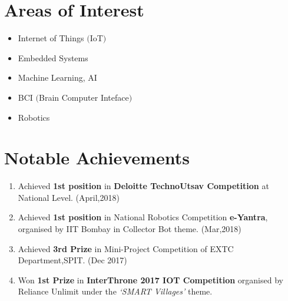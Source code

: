 \documentclass[margin]{res}
\begin{document}
\begin{resume}
\section{Areas of Interest}
\begin{itemize}
\item Internet of Things $($IoT$)$
\item Embedded Systems
\item Machine Learning, AI
\item BCI $($Brain Computer Inteface$)$
\item Robotics
\end{itemize}

\section{Notable Achievements}
\begin{enumerate}
\item Achieved \textbf{1st position} in \textbf{Deloitte TechnoUtsav Competition} at National Level. \hfill   (April,2018)
\item Achieved \textbf{1st position} in National Robotics Competition \textbf{e-Yantra}, organised by IIT Bombay in Collector Bot theme. \hfill   (Mar,2018)
\item Achieved \textbf{3rd Prize} in Mini-Project Competition of EXTC Department,SPIT. \hfill        (Dec 2017)
\item Won \textbf{1st Prize}  in \textbf{InterThrone 2017  IOT Competition} organised by Reliance Unlimit under the \textit{‘SMART Villages’} theme.    


\end{enumerate}

\end{resume}
\end{document}
